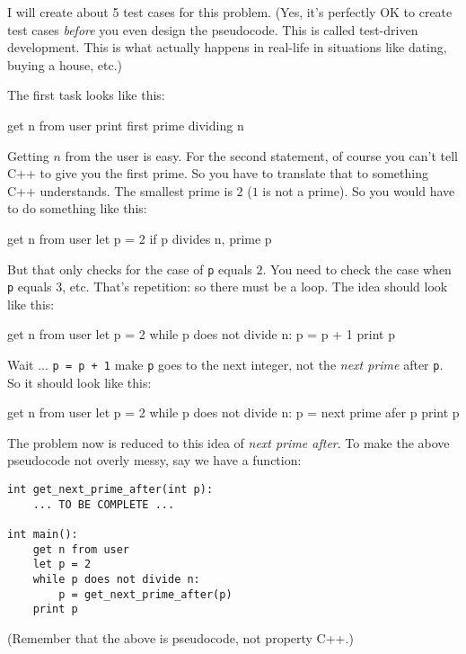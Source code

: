 I will create about 5 test cases for this problem.
(Yes, it's perfectly OK to create test cases \textit{before} you
even design the pseudocode. This is called test-driven development.
This is what actually happens in real-life in situations like dating, buying a house,
etc.)

The first task looks like this:
{\small
\begin{console}
get n from user
print first prime dividing n
\end{console}
}
Getting $n$ from the user is easy.
For the second statement, of course you
can't tell C++ to give you the first prime.
So you have to translate that to something C++ understands.
The smallest prime is $2$ ($1$ is not a prime).
So you would have to do something like this:
{\small
\begin{console}
get n from user
let p = 2
if p divides n, prime p
\end{console}
}
But that only checks for the case of \verb!p! equals $2$.
You need to check the case when \verb!p! equals $3$, etc.
That's repetition: so there must be a loop.
The idea should look like this:
{\small
\begin{console}
get n from user
let p = 2
while p does not divide n:
    p = p + 1
print p
\end{console}
}
Wait ... \verb!p = p + 1! make \verb!p! goes to the next integer,
not the \textit{next prime} after \verb!p!.
So it should look like this:
{\small
\begin{console}
get n from user
let p = 2
while p does not divide n:
    p = next prime afer p
print p
\end{console}
}
The problem now is reduced to this idea of \textit{next prime after}.
To make the above pseudocode not overly messy, say we have a function:
{\small
\begin{Verbatim}[frame=single]
int get_next_prime_after(int p):
    ... TO BE COMPLETE ...

int main():
    get n from user
    let p = 2
    while p does not divide n:
        p = get_next_prime_after(p)
    print p
\end{Verbatim}
}
(Remember that the above is pseudocode, not property C++.)

